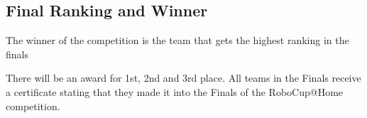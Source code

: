 \subsection{Final Ranking and Winner}
The winner of the competition is the team that gets the highest ranking in the finals

There will be an award for 1st, 2nd and 3rd place. All teams in the Finals receive a certificate stating that they made it into the Finals of the RoboCup@Home competition.


